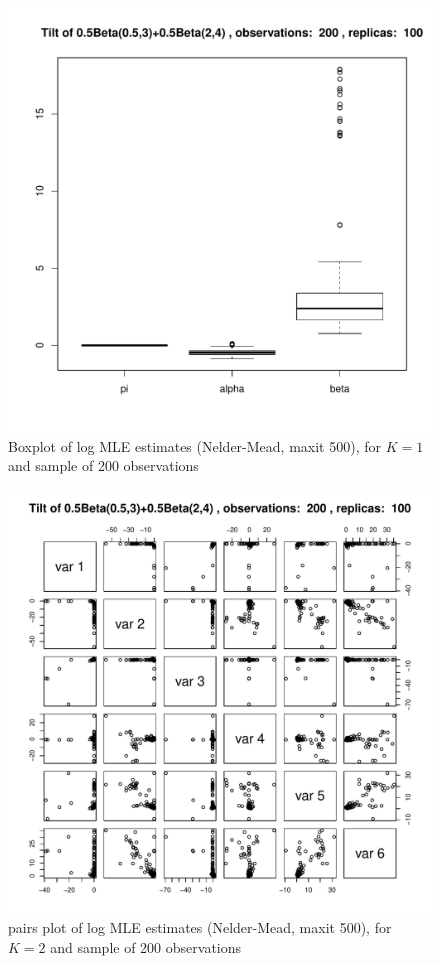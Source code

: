 \begin{figure}[h]
\centering
\includegraphics[width=\textwidth]{../img/p05_a05_b3_p05_a2_b4/tilted/K1/bxplots/n200_R100.pdf}
\caption{Boxplot of log MLE estimates (Nelder-Mead, maxit 500), for $K=1$ and sample of 200 observations}
\label{fig:TBD6}
\end{figure}

\begin{figure}[h]
\centering
\includegraphics[width=\textwidth]{../img/p05_a05_b3_p05_a2_b4/tilted/K2/pairs/n200_R100.pdf}
\caption{pairs plot of log MLE estimates (Nelder-Mead, maxit 500), for $K=2$ and sample of 200 observations}
\label{fig:TBD7}
\end{figure}

